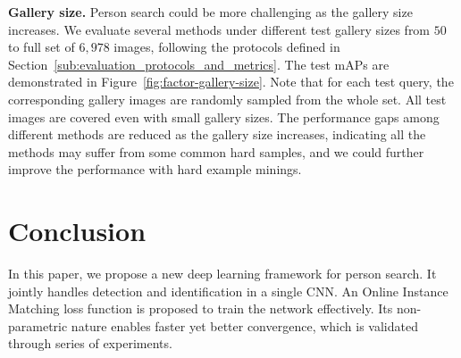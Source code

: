 \textbf{Gallery size.} Person search could be more challenging as the gallery size increases. We evaluate several methods under different test gallery sizes from $50$ to full set of $6,978$ images, following the protocols defined in Section~\ref{sub:evaluation_protocols_and_metrics}. The test mAPs are demonstrated in Figure~\ref{fig:factor-gallery-size}. Note that for each test query, the corresponding gallery images are randomly sampled from the whole set. All test images are covered even with small gallery sizes. The performance gaps among different methods are reduced as the gallery size increases, indicating all the methods may suffer from some common hard samples, and we could further improve the performance with hard example minings.

\section{Conclusion} %
\label{sec:conclusion}
In this paper, we propose a new deep learning framework for person search. It jointly handles detection and identification in a single CNN. An Online Instance Matching loss function is proposed to train the network effectively. Its non-parametric nature enables faster yet better convergence, which is validated through series of experiments.
